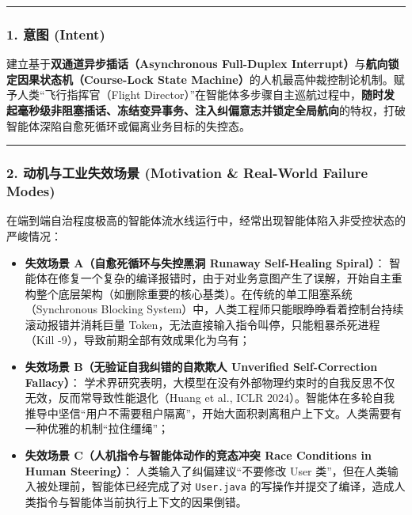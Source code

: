 \documentclass[
]{ctexart}
\providecommand{\tightlist}{%
  \setlength{\itemsep}{0pt}\setlength{\parskip}{0pt}}
\renewcommand{\_}{\discretionary{}{}{\textunderscore}}
\begin{document}
\begin{center}\rule{0.5\linewidth}{0.5pt}\end{center}

\subsubsection{1. 意图 (Intent)}\label{ux610fux56fe-intent-16}

建立基于\textbf{双通道异步插话（Asynchronous Full-Duplex
Interrupt）}与\textbf{航向锁定因果状态机（Course-Lock State
Machine）}的人机最高仲裁控制论机制。赋予人类``飞行指挥官（Flight
Director）''在智能体多步骤自主巡航过程中，\textbf{随时发起毫秒级非阻塞插话、冻结变异事务、注入纠偏意志并锁定全局航向}的特权，打破智能体深陷自愈死循环或偏离业务目标的失控态。

\begin{center}\rule{0.5\linewidth}{0.5pt}\end{center}

\subsubsection{2. 动机与工业失效场景 (Motivation \& Real-World Failure
Modes)}\label{ux52a8ux673aux4e0eux5de5ux4e1aux5931ux6548ux573aux666f-motivation-real-world-failure-modes-16}

在端到端自治程度极高的智能体流水线运行中，经常出现智能体陷入非受控状态的严峻情况：

\begin{itemize}
\tightlist
\item
  \textbf{失效场景 A（自愈死循环与失控黑洞 Runaway Self-Healing
  Spiral）}：
  智能体在修复一个复杂的编译报错时，由于对业务意图产生了误解，开始自主重构整个底层架构（如删除重要的核心基类）。在传统的单工阻塞系统（Synchronous
  Blocking
  System）中，人类工程师只能眼睁睁看着控制台持续滚动报错并消耗巨量
  Token，无法直接输入指令叫停，只能粗暴杀死进程（Kill
  -9），导致前期全部有效成果化为乌有；
\item
  \textbf{失效场景 B（无验证自我纠错的自欺欺人 Unverified
  Self-Correction Fallacy）}：
  学术界研究表明，大模型在没有外部物理约束时的自我反思不仅无效，反而常导致性能退化（Huang
  et al., ICLR
  2024）。智能体在多轮自我推导中坚信``用户不需要租户隔离''，开始大面积剥离租户上下文。人类需要有一种优雅的机制``拉住缰绳''；
\item
  \textbf{失效场景 C（人机指令与智能体动作的竞态冲突 Race Conditions in
  Human Steering）}： 人类输入了纠偏建议``不要修改 User
  类''，但在人类输入被处理前，智能体已经完成了对 \texttt{User.java}
  的写操作并提交了编译，造成人类指令与智能体当前执行上下文的因果倒错。
\end{itemize}
\end{document}
